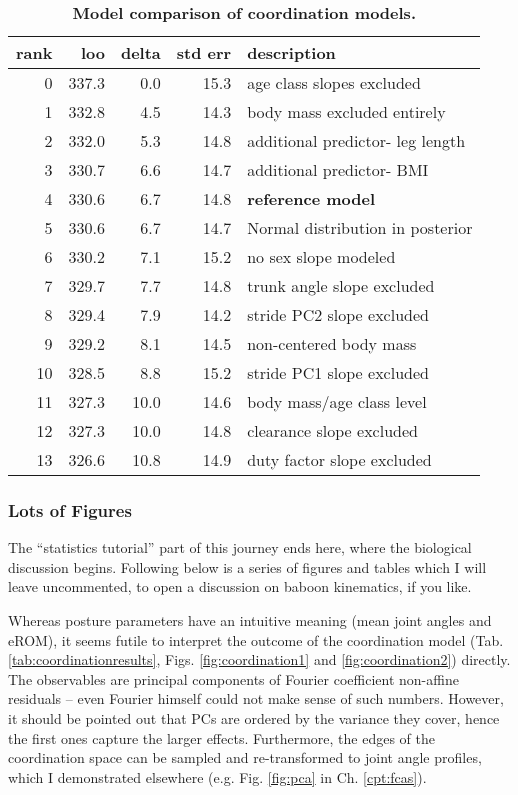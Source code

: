 \begin{table}[p]
\caption{\label{tab:coordinationmodelcomparison}\textbf{Model comparison of coordination models.}}
\centering
\begin{tabular}{rrrrl}
\textbf{rank} & \textbf{loo} & \textbf{delta} & \textbf{std err} & \textbf{description}\\[0pt]
\hline
0 & 337.3 & 0.0 & 15.3 & age class slopes excluded\\[0pt]
1 & 332.8 & 4.5 & 14.3 & body mass excluded entirely\\[0pt]
2 & 332.0 & 5.3 & 14.8 & additional predictor- leg length\\[0pt]
3 & 330.7 & 6.6 & 14.7 & additional predictor- BMI\\[0pt]
4 & 330.6 & 6.7 & 14.8 & \textbf{reference model}\\[0pt]
5 & 330.6 & 6.7 & 14.7 & Normal distribution in posterior\\[0pt]
6 & 330.2 & 7.1 & 15.2 & no sex slope modeled\\[0pt]
7 & 329.7 & 7.7 & 14.8 & trunk angle slope excluded\\[0pt]
8 & 329.4 & 7.9 & 14.2 & stride PC2 slope excluded\\[0pt]
9 & 329.2 & 8.1 & 14.5 & non-centered body mass\\[0pt]
10 & 328.5 & 8.8 & 15.2 & stride PC1 slope excluded\\[0pt]
11 & 327.3 & 10.0 & 14.6 & body mass/age class level\\[0pt]
12 & 327.3 & 10.0 & 14.8 & clearance slope excluded\\[0pt]
13 & 326.6 & 10.8 & 14.9 & duty factor slope excluded\\[0pt]
\end{tabular}
\end{table}


\clearpage
\subsubsection{Lots of Figures}
\label{sec:org00d6433}
The ``statistics tutorial'' part of this journey ends here, where the biological discussion begins.
Following below is a series of figures and tables which I will leave uncommented, to open a discussion on baboon kinematics, if you like.

Whereas posture parameters have an intuitive meaning (mean joint angles and eROM), it seems futile to interpret the outcome of the coordination model (Tab. \ref{tab:coordinationresults}, Figs. \ref{fig:coordination1} and \ref{fig:coordination2}) directly.
The observables are principal components of Fourier coefficient non-affine residuals -- even Fourier himself could not make sense of such numbers.
However, it should be pointed out that PCs are ordered by the variance they cover, hence the first ones capture the larger effects.
Furthermore, the edges of the coordination space can be sampled and re-transformed to joint angle profiles, which I demonstrated elsewhere (e.g. Fig. \ref{fig:pca} in Ch. \ref{cpt:fcas}).



